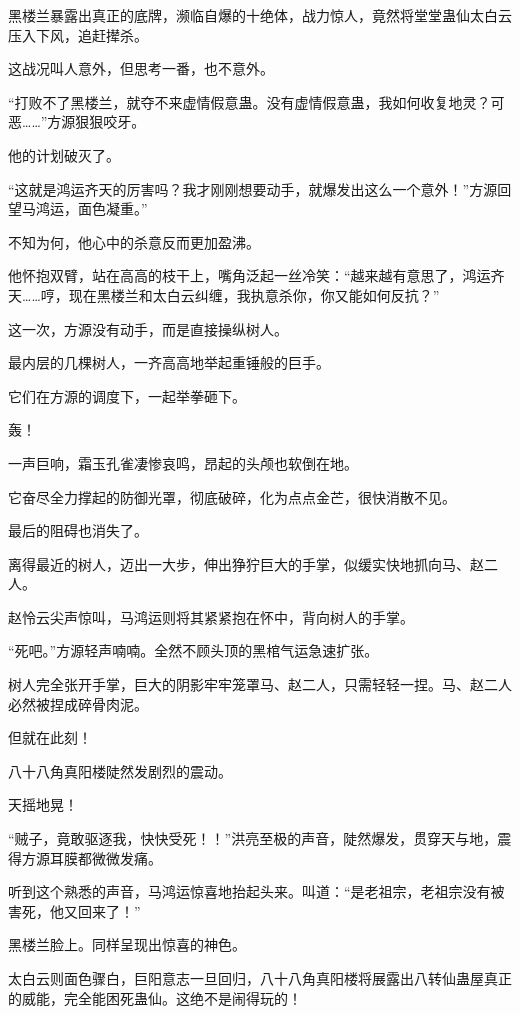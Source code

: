 
\begin{this_body}

黑楼兰暴露出真正的底牌，濒临自爆的十绝体，战力惊人，竟然将堂堂蛊仙太白云压入下风，追赶撵杀。

这战况叫人意外，但思考一番，也不意外。

“打败不了黑楼兰，就夺不来虚情假意蛊。没有虚情假意蛊，我如何收复地灵？可恶……”方源狠狠咬牙。

他的计划破灭了。

“这就是鸿运齐天的厉害吗？我才刚刚想要动手，就爆发出这么一个意外！”方源回望马鸿运，面色凝重。”

不知为何，他心中的杀意反而更加盈沸。

他怀抱双臂，站在高高的枝干上，嘴角泛起一丝冷笑：“越来越有意思了，鸿运齐天……哼，现在黑楼兰和太白云纠缠，我执意杀你，你又能如何反抗？”

这一次，方源没有动手，而是直接操纵树人。

最内层的几棵树人，一齐高高地举起重锤般的巨手。

它们在方源的调度下，一起举拳砸下。

轰！

一声巨响，霜玉孔雀凄惨哀鸣，昂起的头颅也软倒在地。

它奋尽全力撑起的防御光罩，彻底破碎，化为点点金芒，很快消散不见。

最后的阻碍也消失了。

离得最近的树人，迈出一大步，伸出狰狞巨大的手掌，似缓实快地抓向马、赵二人。

赵怜云尖声惊叫，马鸿运则将其紧紧抱在怀中，背向树人的手掌。

“死吧。”方源轻声喃喃。全然不顾头顶的黑棺气运急速扩张。

树人完全张开手掌，巨大的阴影牢牢笼罩马、赵二人，只需轻轻一捏。马、赵二人必然被捏成碎骨肉泥。

但就在此刻！

八十八角真阳楼陡然发剧烈的震动。

天摇地晃！

“贼子，竟敢驱逐我，快快受死！！”洪亮至极的声音，陡然爆发，贯穿天与地，震得方源耳膜都微微发痛。

听到这个熟悉的声音，马鸿运惊喜地抬起头来。叫道：“是老祖宗，老祖宗没有被害死，他又回来了！”

黑楼兰脸上。同样呈现出惊喜的神色。

太白云则面色骤白，巨阳意志一旦回归，八十八角真阳楼将展露出八转仙蛊屋真正的威能，完全能困死蛊仙。这绝不是闹得玩的！


\end{this_body}
